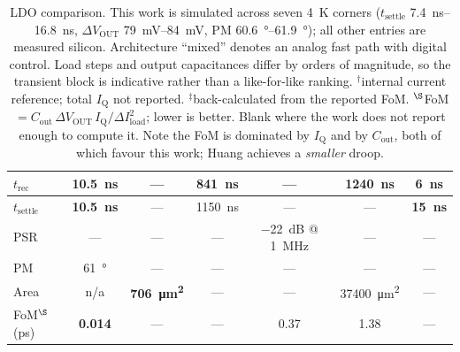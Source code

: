 \begin{table}[t]
\begin{tabular}{@{}l|c|c|c|c|c|c@{}}
\hline
$t_\text{rec}$ & \textbf{\SI{10.5}{\nano\second}} & --- & \SI{841}{\nano\second} & --- & \SI{1240}{\nano\second} & \textbf{\SI{6}{\nano\second}} \\
\hline
$t_\text{settle}$ & \textbf{\SI{10.5}{\nano\second}} & --- & \SI{1150}{\nano\second} & --- & --- & \textbf{\SI{15}{\nano\second}} \\
\hline
PSR & --- & --- & --- & \SI{-22}{\deci\bel} @ \SI{1}{\mega\hertz} & --- & --- \\
\hline
PM & \SI{61}{\degree} & --- & --- & --- & --- & --- \\
\hline
Area & n/a & \textbf{\SI{706}{\micro\meter\squared}} & --- & --- & \SI{37400}{\micro\meter\squared} & --- \\
\hline
FoM$^{\S}$ (\si{\pico\second}) & \textbf{0.014} & --- & --- & 0.37 & 1.38 & --- \\
\bottomrule
\end{tabular}
\caption{LDO comparison. This work is simulated across seven \SI{4}{\kelvin} corners ($t_\text{settle}$ \SIrange{7.4}{16.8}{\nano\second}, $\Delta V_\text{OUT}$ \SIrange{79}{84}{\milli\volt}, PM \SIrange{60.6}{61.9}{\degree}); all other entries are measured silicon. Architecture ``mixed'' denotes an analog fast path with digital control. Load steps and output capacitances differ by orders of magnitude, so the transient block is indicative rather than a like-for-like ranking. $^{\dagger}$internal current reference; total $I_\text{Q}$ not reported. $^{\ddagger}$back-calculated from the reported FoM. $^{\S}$FoM${}=C_\text{out}\,\Delta V_\text{OUT}\,I_\text{Q}/\Delta I_\text{load}^{2}$; lower is better. Blank where the work does not report enough to compute it. Note the FoM is dominated by $I_\text{Q}$ and by $C_\text{out}$, both of which favour this work; Huang achieves a \emph{smaller} droop.}
\label{tab:ldo-comparison}
\end{table}
